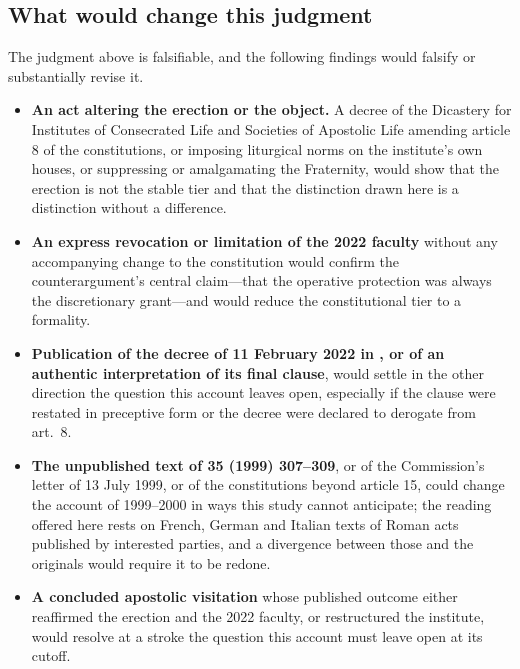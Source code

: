 \subsection{What would change this judgment}

The judgment above is falsifiable, and the following findings would
falsify or substantially revise it.

\begin{itemize}
\item \textbf{An act altering the erection or the object.} A decree of
the Dicastery for Institutes of Consecrated Life and Societies of
Apostolic Life amending article 8 of the constitutions, or imposing
liturgical norms on the institute's own houses, or suppressing or
amalgamating the Fraternity, would show that the erection is not the
stable tier and that the distinction drawn here is a distinction without
a difference.
\item \textbf{An express revocation or limitation of the 2022 faculty}
without any accompanying change to the constitution would confirm the
counterargument's central claim---that the operative protection was always
the discretionary grant---and would reduce the constitutional tier to a
formality.
\item \textbf{Publication of the decree of 11 February 2022 in
, or of an authentic interpretation of its
final clause}, would settle in the other direction the question this
account leaves open, especially if the  clause were
restated in preceptive form or the decree were declared to derogate from
 art.~8.
\item \textbf{The unpublished text of  35 (1999) 307--309},
or of the Commission's letter of 13 July 1999, or of the constitutions
beyond article 15, could change the account of 1999--2000 in ways this
study cannot anticipate; the reading offered here rests on French, German
and Italian texts of Roman acts published by interested parties, and a
divergence between those and the originals would require it to be redone.
\item \textbf{A concluded apostolic visitation} whose published outcome
either reaffirmed the erection and the 2022 faculty, or restructured the
institute, would resolve at a stroke the question this account must leave
open at its cutoff.
\end{itemize}
